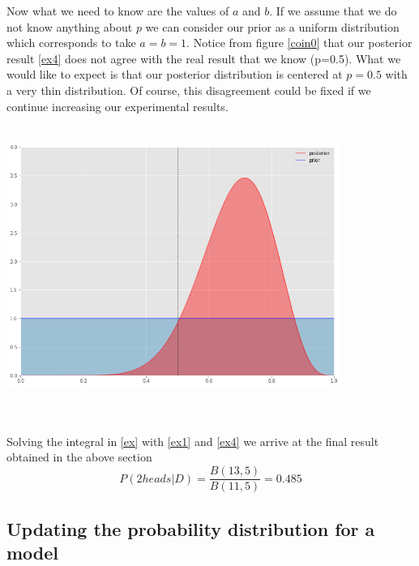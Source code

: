 \documentclass[onecolumn,           %
               showpacs,            %
               preprintnumbers,     %
               aps,                 %
               prl,          	    %
               letterpaper,             %
               superscriptaddress,      %
               nofootinbib,         %
               tightenlines,        %
               floats,floatfix      %
               ,usenatbib,
               ]{revtex4-1}
\begin{document}
Now what we need to know are the values of $a$ and $b$. If we assume that we do not know anything about $p$ we can consider our prior as a uniform distribution which corresponds to take $a=b=1$. 
Notice from figure \ref{coin0} that our posterior result \eqref{ex4} does not agree with the real result that we know (p=0.5). What we would like to expect is that our posterior distribution is centered at $p=0.5$ with a very thin distribution. Of course, this disagreement could be fixed if we continue increasing our experimental results.\\ $ $\\
\begin{minipage}{\textwidth}
\centering
\includegraphics[height=8cm]{Figures/coin0.png}
\label{coin0}
\end{minipage}
\\$ $ \\
Solving the integral in \eqref{ex} with \eqref{ex1} and \eqref{ex4} we arrive at the final result obtained in the above section
\begin{equation}
P(2heads|D)=\frac{B(13,5)}{B(11,5)}=0.485
\end{equation}
%
%
%
\subsection{Updating the probability distribution for a model} 
\end{document}
